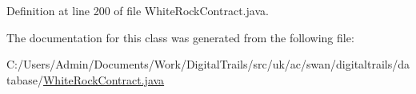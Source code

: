 Definition at line 200 of file White\+Rock\+Contract.\+java.



The documentation for this class was generated from the following file\+:\begin{DoxyCompactItemize}
\item 
C\+:/\+Users/\+Admin/\+Documents/\+Work/\+Digital\+Trails/src/uk/ac/swan/digitaltrails/database/\hyperlink{_white_rock_contract_8java}{White\+Rock\+Contract.\+java}\end{DoxyCompactItemize}
